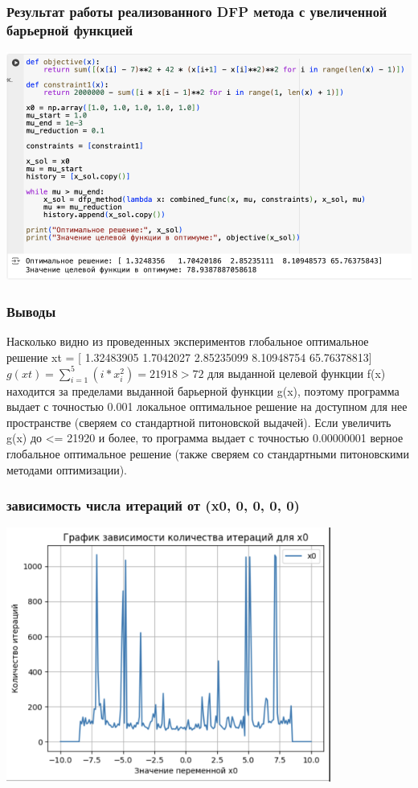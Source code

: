 \documentclass[12pt,pdf,hyperref={unicode}]{beamer}
\begin{document}
\begin{frame}
\frametitle{Результат работы реализованного DFP метода с увеличенной барьерной функцией}
\begin{center}
    \includegraphics[width=1\textwidth]{my_optim_const.png}
\end{center}
\end{frame}

\begin{frame}
\frametitle{Выводы}
Насколько видно из проведенных экспериментов глобальное оптимальное решение xt = [ 1.32483905  1.7042027   2.85235099  8.10948754 65.76378813]
$g(xt) = \sum_{i=1}^5(i*x_i^2) = 21918 > 72$
для выданной целевой функции f(x) находится за пределами выданной барьерной функции g(x), поэтому программа выдает с точностью 0.001 локальное оптимальное решение на доступном для нее пространстве (сверяем со стандартной питоновской выдачей). Если увеличить g(x) до <= 21920 и более, то программа выдает с точностью 0.00000001 верное глобальное оптимальное решение (также сверяем со стандартными питоновскими методами оптимизации). 
\end{frame}

\begin{frame}
\frametitle{зависимость числа итераций от (x0, 0, 0, 0, 0) }
\begin{center}
    \includegraphics[width=0.8\textwidth]{x0.png}
\end{center}
\end{frame}
\end{document}
